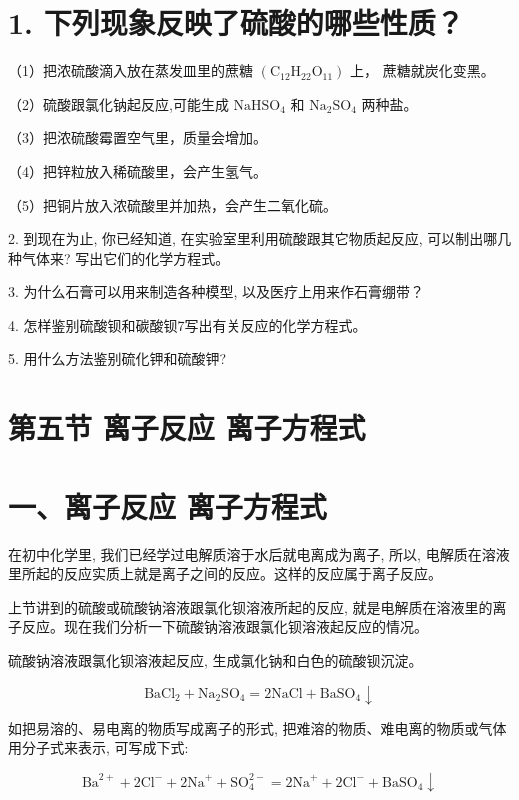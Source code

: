 \documentclass[10pt]{article}
\begin{document}
\section*{1. 下列现象反映了硫酸的哪些性质？}

（1）把浓硫酸滴入放在蒸发皿里的蔗糖 \(\left( {{\mathrm{C}}_{12}{\mathrm{H}}_{22}{\mathrm{O}}_{11}}\right)\) 上， 蔗糖就炭化变黑。

（2）硫酸跟氯化钠起反应,可能生成 \({\mathrm{{NaHSO}}}_{4}\) 和 \({\mathrm{{Na}}}_{2}{\mathrm{{SO}}}_{4}\) 两种盐。

（3）把浓硫酸霉置空气里，质量会增加。

（4）把锌粒放入稀硫酸里，会产生氢气。

（5）把铜片放入浓硫酸里并加热，会产生二氧化硫。

2. 到现在为止, 你已经知道, 在实验室里利用硫酸跟其它物质起反应, 可以制出哪几种气体来? 写出它们的化学方程式。

3. 为什么石膏可以用来制造各种模型, 以及医疗上用来作石膏绷带？

4. 怎样鉴别硫酸钡和碳酸钡7写出有关反应的化学方程式。

5. 用什么方法鉴别硫化钾和硫酸钾?

\section*{第五节 离子反应 离子方程式}

\section*{一、离子反应 离子方程式}

在初中化学里, 我们已经学过电解质溶于水后就电离成为离子, 所以, 电解质在溶液里所起的反应实质上就是离子之间的反应。这样的反应属于离子反应。

上节讲到的硫酸或硫酸钠溶液跟氯化钡溶液所起的反应, 就是电解质在溶液里的离子反应。现在我们分析一下硫酸钠溶液跟氯化钡溶液起反应的情况。

硫酸钠溶液跟氯化钡溶液起反应, 生成氯化钠和白色的硫酸钡沉淀。

\[
{\mathrm{{BaCl}}}_{2} + {\mathrm{{Na}}}_{2}{\mathrm{{SO}}}_{4} = 2\mathrm{{NaCl}} + {\mathrm{{BaSO}}}_{4} \downarrow
\]

如把易溶的、易电离的物质写成离子的形式, 把难溶的物质、难电离的物质或气体用分子式来表示, 可写成下式:

\[
{\mathrm{{Ba}}}^{2 + } + 2{\mathrm{{Cl}}}^{ - } + 2{\mathrm{{Na}}}^{ + } + {\mathrm{{SO}}}_{4}^{2 - } = 2{\mathrm{{Na}}}^{ + } + 2{\mathrm{{Cl}}}^{ - } + {\mathrm{{BaSO}}}_{4} \downarrow
\]
\end{document}
